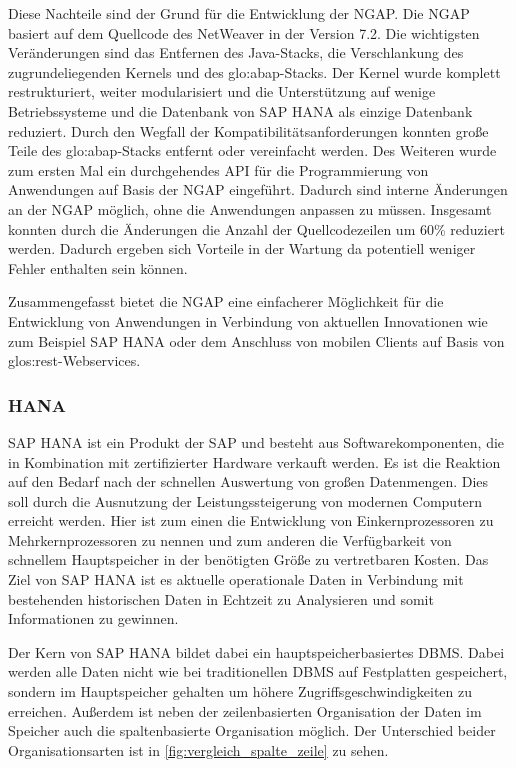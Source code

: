 \begin{onehalfspacing}
Diese Nachteile sind der Grund für die Entwicklung der \gls{NGAP}. Die \gls{NGAP} basiert auf dem Quellcode des \gls{NetWeaver} in der Version 7.2. Die wichtigsten Veränderungen sind das Entfernen des Java-Stacks, die Verschlankung des zugrundeliegenden Kernels und des \gls{glo:abap}-Stacks. Der Kernel wurde komplett restrukturiert, weiter modularisiert und die Unterstützung auf wenige Betriebssysteme und die Datenbank von SAP HANA als einzige Datenbank reduziert. Durch den Wegfall der Kompatibilitätsanforderungen konnten große Teile des \gls{glo:abap}-Stacks entfernt oder vereinfacht werden. Des Weiteren wurde zum ersten Mal ein durchgehendes API für die Programmierung von Anwendungen auf Basis der \gls{NGAP} eingeführt. Dadurch sind interne Änderungen an der \gls{NGAP} möglich, ohne die Anwendungen anpassen zu müssen. Insgesamt konnten durch die Änderungen die Anzahl der Quellcodezeilen um 60\% reduziert werden. Dadurch ergeben sich Vorteile in der Wartung da potentiell weniger Fehler enthalten sein können.

Zusammengefasst bietet die \gls{NGAP} eine einfacherer Möglichkeit für die Entwicklung von Anwendungen in Verbindung von aktuellen Innovationen wie zum Beispiel SAP HANA oder dem Anschluss von mobilen Clients auf Basis von \gls{glos:rest}-Webservices.

\subsubsection{HANA}
SAP HANA ist ein Produkt der SAP und besteht aus Softwarekomponenten, die in Kombination mit zertifizierter Hardware verkauft werden. Es ist die Reaktion auf den Bedarf nach der schnellen Auswertung von großen Datenmengen. Dies soll durch die Ausnutzung der Leistungssteigerung von modernen Computern erreicht werden. Hier ist zum einen die Entwicklung von Einkernprozessoren zu Mehrkernprozessoren zu nennen und zum anderen die Verfügbarkeit von schnellem Hauptspeicher in der benötigten Größe zu vertretbaren Kosten. Das Ziel von SAP HANA ist es aktuelle operationale Daten in Verbindung mit bestehenden historischen Daten in Echtzeit zu Analysieren und somit Informationen zu gewinnen.

Der Kern von SAP HANA bildet dabei ein hauptspeicherbasiertes \gls{DBMS}. Dabei werden alle Daten nicht wie bei traditionellen \gls{DBMS} auf Festplatten gespeichert, sondern im Hauptspeicher gehalten um höhere Zugriffsgeschwindigkeiten zu erreichen. Außerdem ist neben der zeilenbasierten Organisation der Daten im Speicher auch die spaltenbasierte Organisation möglich. Der Unterschied beider Organisationsarten ist in \vref{fig:vergleich_spalte_zeile} zu sehen. 


\end{onehalfspacing}
